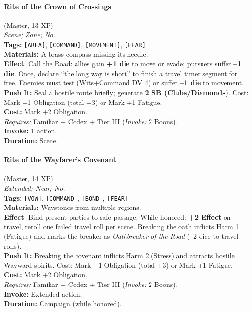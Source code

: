 \paragraph{Rite of the Crown of Crossings} (Master, 13 XP) \hfill \\
\emph{Scene; Zone; No.} \\
\textbf{Tags:} \texttt{[AREA]}, \texttt{[COMMAND]}, \texttt{[MOVEMENT]}, \texttt{[FEAR]} \\
\textbf{Materials:} A brass compass missing its needle. \\
\textbf{Effect:} Call the Road: allies gain \textbf{+1 die} to move or evade; pursuers suffer \textbf{--1 die}. Once, declare ``the long way is short'' to finish a travel timer segment for free. Enemies must test (Wits+Command DV 4) or suffer \textbf{--1 die} to movement. \\
\textbf{Push It:} Seal a hostile route briefly; generate \textbf{2 SB (Clubs/Diamonds)}. Cost: Mark +1 Obligation (total +3) or Mark +1 Fatigue. \\
\textbf{Cost:} Mark +2 Obligation. \\
\textit{Requires:} Familiar + Codex + Tier III (\textit{Invoke:} 2 Boons). \\
\textbf{Invoke:} 1 action. \\
\textbf{Duration:} Scene.

\paragraph{Rite of the Wayfarer's Covenant} (Master, 14 XP) \hfill \\
\emph{Extended; Near; No.} \\
\textbf{Tags:} \texttt{[VOW]}, \texttt{[COMMAND]}, \texttt{[BOND]}, \texttt{[FEAR]} \\
\textbf{Materials:} Waystones from multiple regions. \\
\textbf{Effect:} Bind present parties to safe passage. While honored: \textbf{+2 Effect} on travel, reroll one failed travel roll per scene. Breaking the oath inflicts Harm 1 (Fatigue) and marks the breaker as \textit{Oathbreaker of the Road} (--2 dice to travel rolls). \\
\textbf{Push It:} Breaking the covenant inflicts Harm 2 (Stress) and attracts hostile Wayward spirits. Cost: Mark +1 Obligation (total +3) or Mark +1 Fatigue. \\
\textbf{Cost:} Mark +2 Obligation. \\
\textit{Requires:} Familiar + Codex + Tier III (\textit{Invoke:} 2 Boons). \\
\textbf{Invoke:} Extended action. \\
\textbf{Duration:} Campaign (while honored).

